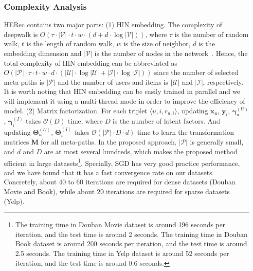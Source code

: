 \subsubsection{Complexity Analysis}
HERec contains two major parts: (1) HIN embedding. %
The complexity of deepwalk is $O(\tau \cdot |\mathcal{V}| \cdot t \cdot w \cdot (d + d \cdot \log|\mathcal{V}|))$, where $\tau$ is the number of random walk, $t$ is the length of random walk, $w$ is the size of neighbor, $d$ is the embedding dimension and $|\mathcal{V}|$ is the number of nodes in the network~\cite{chen2017harp}. Hence, the total complexity of HIN embedding can be abbreviated as $O(|\mathcal{P}| \cdot \tau \cdot t \cdot w \cdot d \cdot (|\mathcal{U}| \cdot \log|\mathcal{U}|+|\mathcal{I}| \cdot \log|\mathcal{I}|))$ since the number of selected meta-paths is $|\mathcal{P}|$ and the number of users and items is $|\mathcal{U}|$ and $|\mathcal{I}|$, respectively.
It is worth noting that HIN embedding can be easily trained in parallel and we will implement it using a multi-thread mode in order to improve the efficiency of model. (2) Matrix factorization. For each triplet $\langle u, i, r_{u,i}\rangle$, updating $\bm{x}_u$, $\bm{y}_i$, $\bm{\gamma}_u^{(U)}$, $\bm{\gamma}_i^{(I)}$ takes $\mathcal{O}(D)$ time, where $D$ is the number of latent factors. And  updating $\bm{\Theta}_u^{(U)}$, $\bm{\Theta}_i^{(I)}$ takes $\mathcal{O}(|\mathcal{P}| \cdot D \cdot d)$ time to learn the transformation matrices  $\mathbf{M}$ for all meta-paths.
In the proposed approach, $|\mathcal{P}|$ is generally small, and $d$ and $D$ are at most several hundreds, which makes the proposed method efficient in large datasets\footnote{The training time in Douban Movie dataset is around 196 seconds per iteration, and the test time is around 2 seconds.  The training time in Douban Book dataset is around 200 seconds per iteration, and the test time is around 2.5 seconds. The training time in Yelp dataset is around 52 seconds per iteration, and the test time is around 0.6 seconds.}. Specially, SGD has very good practice performance, and we have found that it has a fast convergence rate on our datasets. Concretely, about 40 to 60 iterations are required for dense datasets (\ie Douban Movie and Book), while about 20 iterations are required for sparse datasets (\ie Yelp).

